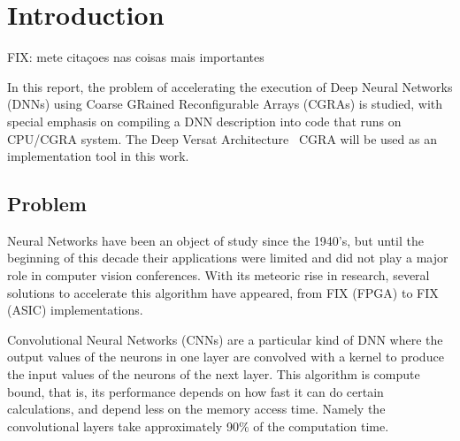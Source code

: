 
\chapter{Introduction}
\label{chapter:introduction}


FIX: mete citaçoes nas coisas mais importantes


In this report, the problem of accelerating the execution of Deep Neural
Networks (DNNs) using Coarse GRained Reconfigurable Arrays (CGRAs) is studied,
with special emphasis on compiling a DNN description into code that runs on
CPU/CGRA system. The Deep Versat Architecture~\cite{bla} CGRA will be used as an
implementation tool in this work.


\section{Problem}
\label{section:problem}

Neural Networks have been an object of study since the 1940's, but until the
beginning of this decade their applications were limited and did not play a
major role in computer vision conferences. With its meteoric rise in research,
several solutions to accelerate this algorithm have appeared, from FIX (FPGA) to
FIX (ASIC) implementations.

Convolutional Neural Networks (CNNs) are a particular kind of DNN where the output
values of the neurons in one layer are convolved with a kernel to produce the
input values of the neurons of the next layer. This algorithm is compute bound,
that is, its performance depends on how fast it can do certain calculations, and
depend less on the memory access time. Namely the convolutional layers take
approximately 90$\%$ of the computation time.

